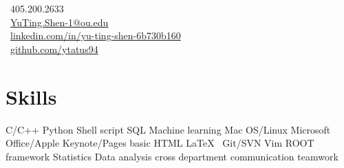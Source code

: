 \documentclass[letterpaper]{deedy-resume-openfont}
\begin{document}
%
%
\lastupdated

%
%

{
    \faPhone \ 405.200.2633\\
    \faEnvelope \ \href{mailto:YuTing.Shen-1@ou.edu}{YuTing.Shen-1@ou.edu}\\
    \faLinkedinSquare \ \href{https://www.linkedin.com/in/yu-ting-shen-6b730b160/}{linkedin.com/in/yu-ting-shen-6b730b160}\\
    \faGithub \ \href{https://github.com/ytatus94}{github.com/ytatus94}
}




\section{Skills}
\raggedright{
	C/C++ \textbullet{} Python \textbullet{} Shell script \textbullet{} SQL \textbullet{} Machine learning \textbullet{} Mac OS/Linux \textbullet{} Microsoft Office/Apple Keynote/Pages \textbullet{} basic HTML \textbullet{} \LaTeX\ \textbullet{} Git/SVN \textbullet{} Vim \textbullet{} ROOT framework \textbullet{} Statistics \textbullet{} Data analysis \textbullet{} cross department communication \textbullet{} teamwork\\
}
\sectionsep
\end{document}
